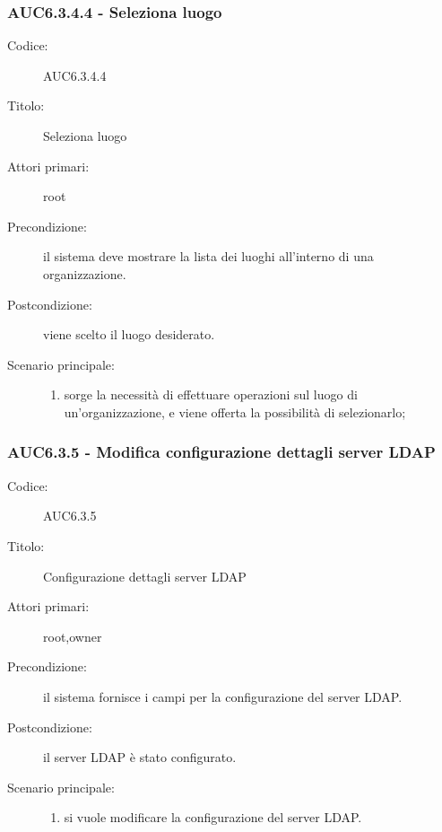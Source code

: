 \documentclass[casi-duso]{subfiles}
\begin{document}
\subsubsection{AUC6.3.4.4 - Seleziona luogo}%
\label{subsub:AUC6.3.4.4}
\begin{description}
  \item[Codice:] AUC6.3.4.4
  \item[Titolo:] Seleziona luogo
  \item[Attori primari:] root
  \item[Precondizione:] il sistema deve mostrare la lista dei luoghi all'interno di una organizzazione.
  \item[Postcondizione:] viene scelto il luogo desiderato.
  \item[Scenario principale:]
  \begin{enumerate}
    \item sorge la necessità di effettuare operazioni sul luogo di un'organizzazione, e viene offerta la possibilità di selezionarlo;
  \end{enumerate}
\end{description}

\subsubsection{AUC6.3.5 - Modifica configurazione dettagli server LDAP}%
  \label{subsub:AUC6.3.5}
  \begin{description}
    \item[Codice:] AUC6.3.5
    \item[Titolo:] Configurazione dettagli server LDAP
    \item[Attori primari:] root,owner
    \item[Precondizione:] il sistema fornisce i campi per la configurazione del server LDAP.
    \item[Postcondizione:] il server LDAP è stato configurato.
    \item[Scenario principale:]
    \begin{enumerate}
      \item si vuole modificare la configurazione del server LDAP.
    \end{enumerate}
  \end{description}
\end{document}
